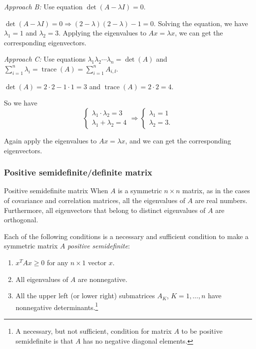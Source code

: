 \begin{solution}
\noindent\emph{Approach B:} Use equation \(\det(A-\lambda I)=0\).

\(\det(A-\lambda I)=0\Rightarrow (2-\lambda)(2-\lambda)-1=0.\) Solving the equation, we have \(\lambda_1=1\) and \(\lambda_2=3\). Applying the eigenvalues to \(Ax=\lambda x\), we can get the corresponding eigenvectors.

\noindent\emph{Approach C:} Use equations \(\lambda_1\lambda_2\cdots\lambda_n=\det(A)\) and \(\sum_{i=1}^{n}\lambda_i=\operatorname{trace}(A)=\sum_{i=1}^{n}A_{i,\ii}\).

\(\det(A)=2\cdot2-1\cdot1=3\) and \(\operatorname{trace}(A)=2\cdot2=4.\)

So we have
\[
\begin{cases}
\lambda_1\cdot\lambda_2=3\\
\lambda_1+\lambda_2=4
\end{cases}
\Rightarrow
\begin{cases}
\lambda_1=1\\
\lambda_2=3.
\end{cases}
\]

Again apply the eigenvalues to \(Ax=\lambda x\), and we can get the corresponding eigenvectors.
\end{solution}

\subsubsection{Positive semidefinite/definite matrix}

\begin{concept}{Positive semidefinite matrix}
When \(A\) is a symmetric \(n\times n\) matrix, as in the cases of covariance and correlation matrices, all the eigenvalues of \(A\) are real numbers. Furthermore, all eigenvectors that belong to distinct eigenvalues of \(A\) are orthogonal.

Each of the following conditions is a necessary and sufficient condition to make a symmetric matrix \(A\) \emph{positive semidefinite}:
\begin{enumerate}
\item \(x^T A x\ge0\) for any \(n\times1\) vector \(x\).
\item All eigenvalues of \(A\) are nonnegative.
\item All the upper left (or lower right) submatrices \(A_K\), \(K=1,\ldots,n\) have nonnegative determinants.\footnote[16]{A necessary, but not sufficient, condition for matrix \(A\) to be positive semidefinite is that \(A\) has no negative diagonal elements.}
\end{enumerate}
\end{concept}

